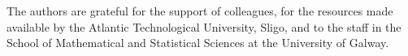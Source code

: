 \begin{acknowledgments}
The authors are grateful for the support of colleagues, for the resources made available by the Atlantic Technological University, Sligo, and to the staff in the School of Mathematical and Statistical Sciences at the University of Galway.
\end{acknowledgments}
